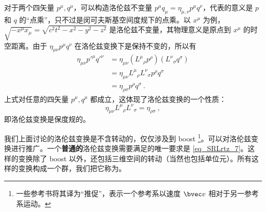对于两个四矢量 $p^\mu,q^\mu$，可以构造洛伦兹不变量 $p^\mu q_\mu=\eta_{\mu,\nu}p^\mu q^\nu$，代表的意义是 $p$ 和 $q$ 的“点乘”，只不过是闵可夫斯基空间度规下的点乘。以 $x^\mu$ 为例，$\sqrt{-x^\mu x_\mu}=\sqrt{c^2t^2-x^2-y^2-z^2}$ 是洛伦兹不变量，其物理意义是原点到 $x^\mu$ 的时空距离。由于 $\eta_{\mu\nu}p^\mu q^\nu$ 在洛伦兹变换下是保持不变的，所以有
\begin{equation}
\begin{aligned}
\eta_{\mu\nu}p'^\mu q'^\nu&=\eta_{\mu\nu}({L^\mu}_\rho p^\rho) ({L^\nu}_\sigma q^\sigma)\\
&=\eta_{\mu\nu}{L^\mu}_\rho {L^\nu}_\sigma p^\rho q^\sigma
\\
&=\eta_{\rho\sigma} p^\rho q^\sigma~.
\end{aligned}
\end{equation}
上式对任意的四矢量 $p^\mu,q^\mu$ 都成立，这体现了洛伦兹变换的一个性质：
\begin{equation}\label{eq_SRLrtz_7}
\eta_{\mu\nu}{L^\mu}_\rho {L^\nu}_\sigma=\eta_{\rho\sigma}~,
\end{equation}
即洛伦兹变换是保度规的。

我们上面讨论的洛伦兹变换是不含转动的，仅仅涉及到 boost \footnote{一些参考书将其译为“推促”，表示一个参考系以速度 $\bvec v$ 相对于另一参考系运动。}。可以对洛伦兹变换进行推广。一个\textbf{普通的}洛伦兹变换需要满足的唯一要求是 \autoref{eq_SRLrtz_7}。这样的变换除了 boost 以外，还包括三维空间的转动（当然也包括单位元）。所有这样的变换构成一个群，我们把它称为。
